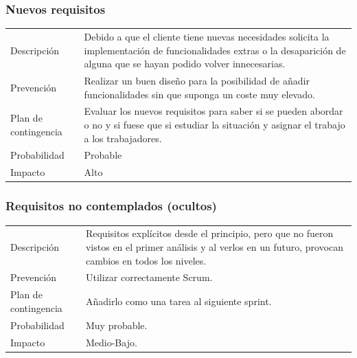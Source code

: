 \subsubsection{Nuevos requisitos}
\begin{table}[H]
    \begin{center}
        \begin{tabular}{l p{8cm}}
            Descripci\'{o}n                 & Debido a que el cliente tiene nuevas necesidades solicita la
            implementaci\'{o}n de funcionalidades extras o la desaparici\'{o}n de alguna que se hayan podido volver innecesarias. \\
            Prevenci\'{o}n                  & Realizar un buen dise\~{n}o para la posibilidad de añadir
            funcionalidades sin que suponga un coste muy elevado. \\ 
            Plan de contingencia            & Evaluar los nuevos requisitos para saber si se pueden
            abordar o no y si fuese que si estudiar la situación y asignar el trabajo a los trabajadores. \\
            Probabilidad                    & Probable \\
            Impacto                         & Alto \\
        \end{tabular}
    \end{center}
    
\end{table}

\subsubsection{Requisitos no contemplados (ocultos)}
\begin{table}[H]
    \begin{center}
        \begin{tabular}{l p{8cm}}
            Descripci\'{o}n                 & Requisitos explícitos desde el principio, pero que no fueron
            vistos en el primer an\'{a}lisis y al verlos en un futuro, provocan cambios en todos los niveles. \\
            Prevenci\'{o}n                  & Utilizar correctamente Scrum. \\ 
            Plan de contingencia            & A\~{n}adirlo como una tarea al siguiente sprint. \\
            Probabilidad                    & Muy probable. \\
            Impacto                         & Medio-Bajo. \\
        \end{tabular}
    \end{center}
    
\end{table}

